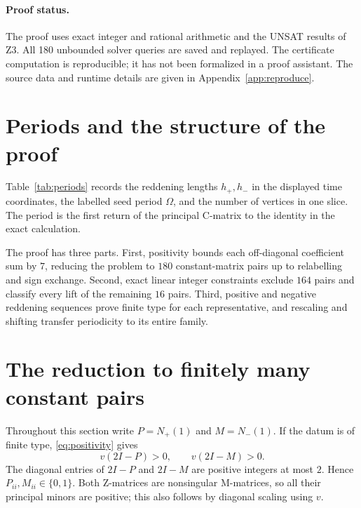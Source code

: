 \documentclass[11pt,a4paper]{article}
\theoremstyle{definition}
\begin{document}
\paragraph{Proof status.}
The proof uses exact integer and rational arithmetic and the UNSAT results
of Z3. All 180 unbounded solver queries are saved and replayed. The
certificate computation is reproducible; it has not been formalized in a
proof assistant. The source data and runtime details are given in
Appendix~\ref{app:reproduce}.

\section{Periods and the structure of the proof}\label{sec:overview}

Table~\ref{tab:periods} records the reddening lengths $h_+,h_-$ in the
displayed time coordinates, the labelled seed period $\Omega$, and the number of
vertices in one slice. The period is the first return of the principal
C-matrix to the identity in the exact calculation.

\begin{table}[!ht]
\centering\small\renewcommand{\arraystretch}{1.02}

\caption{Periods of the sixteen representatives.}\label{tab:periods}
\end{table}

The proof has three parts. First, positivity bounds each off-diagonal
coefficient sum by $7$, reducing the problem to $180$ constant-matrix pairs
up to relabelling and sign exchange. Second, exact linear integer constraints
exclude $164$ pairs and classify every lift of the remaining $16$ pairs.
Third, positive and negative reddening sequences prove finite type for
each representative, and rescaling and shifting transfer periodicity to
its entire family.

\section{The reduction to finitely many constant pairs}\label{sec:constants}

Throughout this section write $P=N_+(1)$ and $M=N_-(1)$. If the datum is of
finite type, \eqref{eq:positivity} gives
\begin{equation}\label{eq:pm-positive}
 v(2I-P)>0,\qquad v(2I-M)>0.
\end{equation}
The diagonal entries of $2I-P$ and $2I-M$ are positive integers at most $2$.
Hence $P_{ii},M_{ii}\in\{0,1\}$. Both Z-matrices are nonsingular M-matrices,
so all their principal minors are positive; this also follows by diagonal
scaling using $v$.
\end{document}
